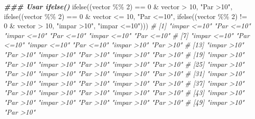 \documentclass[
]{article}
\newenvironment{Shaded}{\begin{snugshade}}{\end{snugshade}}
\newcommand{\CommentTok}[1]{\textcolor[rgb]{0.56,0.35,0.01}{\textit{#1}}}
\newcommand{\DecValTok}[1]{\textcolor[rgb]{0.00,0.00,0.81}{#1}}
\newcommand{\DocumentationTok}[1]{\textcolor[rgb]{0.56,0.35,0.01}{\textbf{\textit{#1}}}}
\newcommand{\FunctionTok}[1]{\textcolor[rgb]{0.00,0.00,0.00}{#1}}
\newcommand{\NormalTok}[1]{#1}
\newcommand{\SpecialCharTok}[1]{\textcolor[rgb]{0.00,0.00,0.00}{#1}}
\newcommand{\StringTok}[1]{\textcolor[rgb]{0.31,0.60,0.02}{#1}}
\theoremstyle{definition}
\theoremstyle{definition}
\theoremstyle{definition}
\theoremstyle{definition}
\theoremstyle{remark}
\begin{document}
\begin{Shaded}
\begin{Highlighting}[]
\DocumentationTok{\#\#\# Usar ifelse()}
\FunctionTok{ifelse}\NormalTok{((vector }\SpecialCharTok{\%\%} \DecValTok{2}\NormalTok{) }\SpecialCharTok{==} \DecValTok{0} \SpecialCharTok{\&}\NormalTok{ vector }\SpecialCharTok{\textgreater{}} \DecValTok{10}\NormalTok{, }\StringTok{"Par \textgreater{}10"}\NormalTok{, }
       \FunctionTok{ifelse}\NormalTok{((vector }\SpecialCharTok{\%\%} \DecValTok{2}\NormalTok{) }\SpecialCharTok{==} \DecValTok{0} \SpecialCharTok{\&}\NormalTok{ vector }\SpecialCharTok{\textless{}=} \DecValTok{10}\NormalTok{, }\StringTok{"Par \textless{}=10"}\NormalTok{, }
              \FunctionTok{ifelse}\NormalTok{((vector }\SpecialCharTok{\%\%} \DecValTok{2}\NormalTok{) }\SpecialCharTok{!=} \DecValTok{0} \SpecialCharTok{\&}\NormalTok{ vector }\SpecialCharTok{\textgreater{}} \DecValTok{10}\NormalTok{, }\StringTok{"impar \textgreater{}10"}\NormalTok{, }\StringTok{"impar \textless{}=10"}\NormalTok{)))}
\CommentTok{\#  [1] "impar \textless{}=10" "Par \textless{}=10"   "impar \textless{}=10" "Par \textless{}=10"   "impar \textless{}=10" "Par \textless{}=10"  }
\CommentTok{\#  [7] "impar \textless{}=10" "Par \textless{}=10"   "impar \textless{}=10" "Par \textless{}=10"   "impar \textgreater{}10"  "Par \textgreater{}10"   }
\CommentTok{\# [13] "impar \textgreater{}10"  "Par \textgreater{}10"    "impar \textgreater{}10"  "Par \textgreater{}10"    "impar \textgreater{}10"  "Par \textgreater{}10"   }
\CommentTok{\# [19] "impar \textgreater{}10"  "Par \textgreater{}10"    "impar \textgreater{}10"  "Par \textgreater{}10"    "impar \textgreater{}10"  "Par \textgreater{}10"   }
\CommentTok{\# [25] "impar \textgreater{}10"  "Par \textgreater{}10"    "impar \textgreater{}10"  "Par \textgreater{}10"    "impar \textgreater{}10"  "Par \textgreater{}10"   }
\CommentTok{\# [31] "impar \textgreater{}10"  "Par \textgreater{}10"    "impar \textgreater{}10"  "Par \textgreater{}10"    "impar \textgreater{}10"  "Par \textgreater{}10"   }
\CommentTok{\# [37] "impar \textgreater{}10"  "Par \textgreater{}10"    "impar \textgreater{}10"  "Par \textgreater{}10"    "impar \textgreater{}10"  "Par \textgreater{}10"   }
\CommentTok{\# [43] "impar \textgreater{}10"  "Par \textgreater{}10"    "impar \textgreater{}10"  "Par \textgreater{}10"    "impar \textgreater{}10"  "Par \textgreater{}10"   }
\CommentTok{\# [49] "impar \textgreater{}10"  "Par \textgreater{}10"}
\end{Highlighting}
\end{Shaded}
\end{document}
